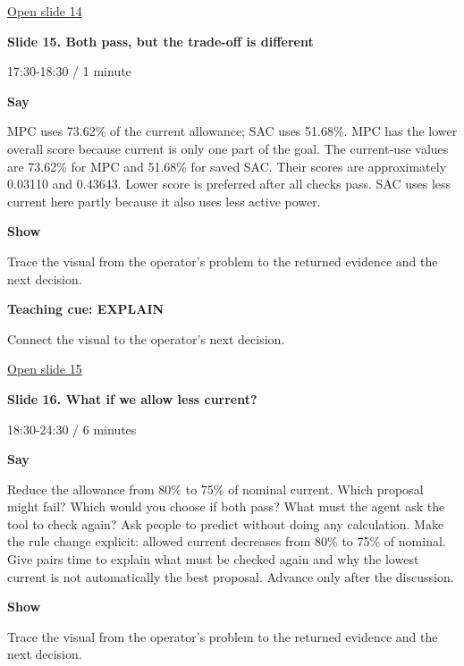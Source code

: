 \documentclass[12pt,letterpaper]{article}
\begin{document}
\vfill\href{https://alaaselim-sudo.github.io/GridGuard-Agentic-AI-Tutorials/operator-cases/#/14}{Open slide 14}\par
\clearpage{}
{\Large\bfseries\color{IEEEBlue} Slide 15. Both pass, but the trade-off is different\par}\medskip
{\small\color{Slate} 17:30-18:30 /\allowbreak{} 1 minute\par}\medskip
\textbf{Say}\par MPC uses 73.62\% of the current allowance; SAC uses 51.68\%. MPC has the lower overall score because current is only one part of the goal. The current-use values are 73.62\% for MPC and 51.68\% for saved SAC. Their scores are approximately 0.03110 and 0.43643. Lower score is preferred after all checks pass. SAC uses less current here partly because it also uses less active power.\par\medskip
\textbf{Show}\par Trace the visual from the operator's problem to the returned evidence and the next decision.\par\medskip
\textbf{Teaching cue: EXPLAIN}\par Connect the visual to the operator's next decision.\par\medskip
\vfill\href{https://alaaselim-sudo.github.io/GridGuard-Agentic-AI-Tutorials/operator-cases/#/15}{Open slide 15}\par
\clearpage{}
{\Large\bfseries\color{IEEEBlue} Slide 16. What if we allow less current?\par}\medskip
{\small\color{Slate} 18:30-24:30 /\allowbreak{} 6 minutes\par}\medskip
\textbf{Say}\par Reduce the allowance from 80\% to 75\% of nominal current. Which proposal might fail? Which would you choose if both pass? What must the agent ask the tool to check again? Ask people to predict without doing any calculation. Make the rule change explicit: allowed current decreases from 80\% to 75\% of nominal. Give pairs time to explain what must be checked again and why the lowest current is not automatically the best proposal. Advance only after the discussion.\par\medskip
\textbf{Show}\par Trace the visual from the operator's problem to the returned evidence and the next decision.\par\medskip
\end{document}
